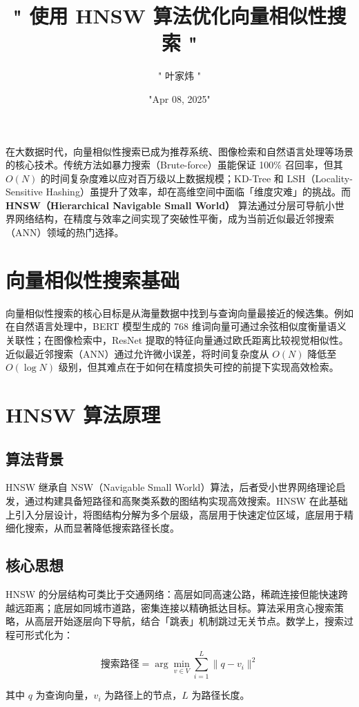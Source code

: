 \title{" 使用 HNSW 算法优化向量相似性搜索 "}
\author{" 叶家炜 "}
\date{"Apr 08, 2025"}
\maketitle
在大数据时代，向量相似性搜索已成为推荐系统、图像检索和自然语言处理等场景的核心技术。传统方法如暴力搜索（Brute-force）虽能保证 100\%{} 召回率，但其 $O(N)$ 的时间复杂度难以应对百万级以上数据规模；KD-Tree 和 LSH（Locality-Sensitive Hashing）虽提升了效率，却在高维空间中面临「维度灾难」的挑战。而 \textbf{HNSW（Hierarchical Navigable Small World）} 算法通过分层可导航小世界网络结构，在精度与效率之间实现了突破性平衡，成为当前近似最近邻搜索（ANN）领域的热门选择。\par
\chapter{向量相似性搜索基础}
向量相似性搜索的核心目标是从海量数据中找到与查询向量最接近的候选集。例如在自然语言处理中，BERT 模型生成的 768 维词向量可通过余弦相似度衡量语义关联性；在图像检索中，ResNet 提取的特征向量通过欧氏距离比较视觉相似性。近似最近邻搜索（ANN）通过允许微小误差，将时间复杂度从 $O(N)$ 降低至 $O(\log N)$ 级别，但其难点在于如何在精度损失可控的前提下实现高效检索。\par
\chapter{HNSW 算法原理}
\section{算法背景}
HNSW 继承自 NSW（Navigable Small World）算法，后者受小世界网络理论启发，通过构建具备短路径和高聚类系数的图结构实现高效搜索。HNSW 在此基础上引入分层设计，将图结构分解为多个层级，高层用于快速定位区域，底层用于精细化搜索，从而显著降低搜索路径长度。\par
\section{核心思想}
HNSW 的分层结构可类比于交通网络：高层如同高速公路，稀疏连接但能快速跨越远距离；底层如同城市道路，密集连接以精确抵达目标。算法采用贪心搜索策略，从高层开始逐层向下导航，结合「跳表」机制跳过无关节点。数学上，搜索过程可形式化为：\par
$$ \text{搜索路径} = \arg\min_{v \in V} \sum_{i=1}^{L} \|q - v_i\|^2 $$\par
其中 $q$ 为查询向量，$v_i$ 为路径上的节点，$L$ 为路径长度。\par
